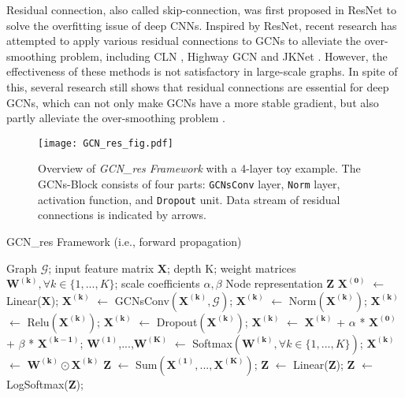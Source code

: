 \documentclass[runningheads]{llncs}
\begin{document}
Residual connection, also called skip-connection, was first
proposed in ResNet \cite{he2016deep} to solve the overfitting
issue of deep CNNs. Inspired by ResNet, recent
research has attempted to apply various residual connections to GCNs
to alleviate the over-smoothing problem, including CLN \cite{pham2017column} , Highway GCN \cite{rahimi2018semi} and JKNet \cite{xu2018representation} . However, the effectiveness of these methods is 
not satisfactory in large-scale graphs. In spite of this, several research still shows that residual connections are essential for deep GCNs, which can not only make GCNs have a more stable gradient, but also
partly alleviate the over-smoothing problem \cite{li2020deepergcn,chen2020simple}.

\begin{figure*}[htbp]
    \centering
    \texttt{[image: GCN\_res\_fig.pdf]}
    \caption{Overview of \textsl{GCN\_res Framework} with a 4-layer toy example. The GCNs-Block consists of four parts: \texttt{GCNsConv} layer, \texttt{Norm} layer, activation function, and \texttt{Dropout} unit. Data stream of residual connections is indicated by arrows.}
    \label{fig:GCN_res}
\end{figure*}

\begin{algorithm}[h]
\caption{GCN\_res Framework (i.e., forward propagation)}
\label{algo:framework}
\begin{algorithmic}[1]
\REQUIRE Graph $\mathcal{G}$; input feature matrix $\bm{X}$; depth K; weight matrices $\mathbf{W^{(k)}},\forall k \in \{1,...,K\}$; scale coefficients $\alpha,\beta$
\ENSURE Node representation $\bm{Z}$
\STATE $\bm{X^{(0)}}$ $\leftarrow$ Linear($\bm{X}$);
    \STATE $\bm{X^{(k)}}$ $\leftarrow$ GCNsConv$\left(\bm{X^{(k)}}, \mathcal{G}\right)$;
    \STATE $\bm{X^{(k)}}$ $\leftarrow$ Norm$\left(\bm{X^{(k)}}\right)$;
    \STATE $\bm{X^{(k)}}$ $\leftarrow$ Relu$\left(\bm{X^{(k)}}\right)$;
    \STATE $\bm{X^{(k)}}$ $\leftarrow$ Dropout$\left(\bm{X^{(k)}}\right)$;
    \STATE $\bm{X^{(k)}}$ $\leftarrow$ $\bm{X^{(k)}}$ + $\alpha$ * $\bm{X^{(0)}}$ + $\beta$ * $\bm{X^{(k-1)}}$;
\ENDFOR
\STATE $\mathbf{W^{(1)}}$,...,$\mathbf{W^{(K)}}$ $\leftarrow$ Softmax$\left(\mathbf{W^{(k)}},\forall k \in \{1,...,K\}\right)$;
    \STATE $\bm{X^{(k)}}$ $\leftarrow$ $\mathbf{W^{(k)}} \odot \bm{X^{(k)}}$
\ENDFOR
\STATE $\bm{Z}$ $\leftarrow$ Sum$\left(\bm{X^{(1)}},...,\bm{X^{(K)}}\right)$;
\STATE $\bm{Z}$ $\leftarrow$ Linear($\bm{Z}$);
\STATE $\bm{Z}$ $\leftarrow$ LogSoftmax($\bm{Z}$);
\end{algorithmic}
\end{algorithm}
\end{document}
